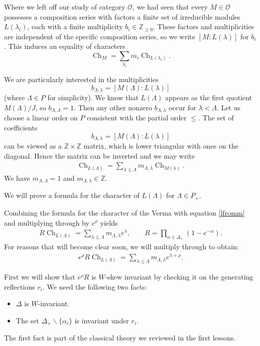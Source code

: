 \documentclass[12pt]{article}
\theoremstyle{plain}
\theoremstyle{definition}
\numberwithin{equation}{section}
\DeclareMathOperator{\ch}{Ch}
\newcommand{\al}{\alpha}
\newcommand{\la}{\lambda}
\newcommand{\La}{\Lambda}
\newcommand{\D}{\Delta}
\newcommand{\Z}{\mathbb{Z}}
\newcommand{\OO}{\mathcal{O}}
\begin{document}
Where we left off our study of category $\OO$, we had seen that every $M \in \OO$ possesses a composition series with factors a finite set of irreducible modules $L(\la_i)$, each with a finite multiplicity $b_i \in \Z_{\geq 0}$. These factors and multiplicities are independent of the specific composition series, so we write $[M : L(\la)]$ for $b_i$. This induces an equality of characters
\[
\ch_M = \sum_{\la_i} m_i \ch_{L(\la_i)}.
\]

We are particularly interested in the multiplicities
\[
b_{\La, \la} = [M(\La) : L(\la)]
\]
(where $\La \in P$ for simplicity). We know that $L(\La)$ appears as the first quotient $M(\La) / J$, so $b_{\La, \La} = 1$. Then any other nonzero $b_{\La, \la}$ occur for $\la < \La$. Let us choose a linear order on $P$ consistent with the partial order $\leq$. The set of coefficients
\[
b_{\La, \la} = [M(\La) : L(\la)]
\]
can be viewed as a $\Z \times \Z$ matrix, which is lower triangular with ones on the diagonal. Hence the matrix can be inverted and we may write
\begin{align} \label{lfromm}
\ch_{L(\La)} = \sum_{\la \leq \La} m_{\La, \la} \ch_{M(\la)}.
\end{align}
We have $m_{\La, \La} = 1$ and $m_{\La, \la} \in \Z$.







We will prove a formula for the character of $L(\La)$ for $\La \in P_+$.

Combining the formula for the character of the Verma with equation \eqref{lfromm} and multiplying through by $e^\rho$ yields
\begin{align} \label{wkp-pre}
R \ch_{L(\La)} = \sum_{\la \leq \La} m_{\La, \la} e^{\la}, \qquad R = \prod_{\al \in \D_+} (1-e^{-\al}).
\end{align}
For reasons that will become clear soon, we will multiply through to obtain:
\begin{align} \label{wkp}
e^\rho R \ch_{L(\La)} = \sum_{\la \leq \La} m_{\La, \la} e^{\la+\rho}.
\end{align}


First we will show that $e^\rho R$ is $W$-skew invariant by checking it on the generating reflections $r_i$. We need the following two facts:
\begin{itemize}
\item $\D$ is $W$-invariant.

\item The set $\D_+ \backslash \{\al_i\}$ is invariant under $r_i$.
\end{itemize}
The first fact is part of the classical theory we reviewed in the first lessons.
\end{document}
